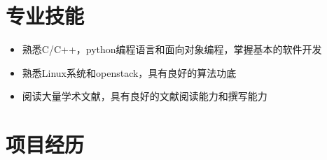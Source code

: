 \documentclass[]{friggeri-cv} %
\begin{document}
\section{专业技能}
\begin{itemize}
    \item 熟悉C/C++，python编程语言和面向对象编程，掌握基本的软件开发
    \item 熟悉Linux系统和openstack，具有良好的算法功底
    \item 阅读大量学术文献，具有良好的文献阅读能力和撰写能力
\end{itemize}


\section{项目经历}
\end{document}
